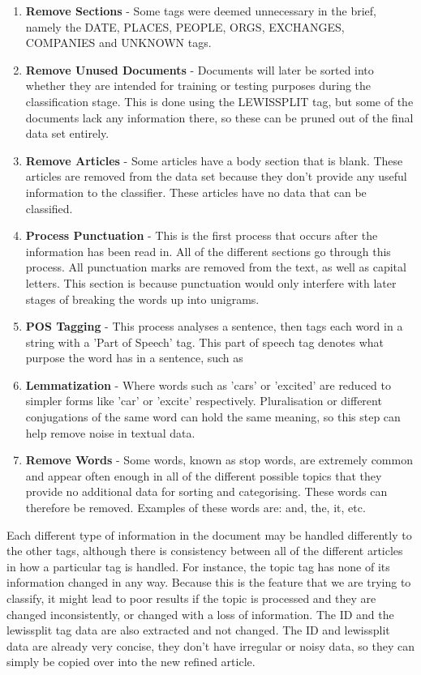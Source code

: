 \documentclass[11pt]{article}
\begin{document}
\begin{enumerate}
\item \textbf{Remove Sections} - Some tags were deemed unnecessary in the brief, namely the DATE, PLACES, PEOPLE, ORGS, EXCHANGES, COMPANIES and UNKNOWN    tags.
\item \textbf{Remove Unused Documents} - Documents will later be sorted into whether they are intended for training or testing purposes during the classification stage. This is done using the LEWISSPLIT tag, but some of the documents lack any information there, so these can be pruned out of the final data set entirely.
\item \textbf{Remove Articles} - Some articles have a body section that is blank. These articles are removed from the data set because they don’t provide any useful information to the classifier. These articles have no data that can be classified.
\item \textbf{Process Punctuation} - This is the first process that occurs after the information has been read in. All of the different sections go through this process. All punctuation marks are removed from the text, as well as capital letters. This section is because punctuation would only interfere with later stages of breaking the words up into unigrams.
\item \textbf{POS Tagging}  - This process analyses a sentence, then tags each word in a string with a 'Part of Speech' tag. This part of speech tag denotes what purpose the word has in a sentence, such as
\item \textbf{Lemmatization} - Where words such as 'cars' or 'excited' are reduced to simpler forms like 'car' or 'excite' respectively. Pluralisation or different conjugations of the same word can hold the same meaning, so this step can help remove noise in textual data.
\item \textbf{Remove Words} - Some words, known as stop words, are extremely common and appear often enough in all of the different possible topics that they provide no additional data for sorting and categorising. These words can therefore be removed. Examples of these words are: and, the, it, etc.
\end{enumerate}

Each different type of information in the document may be handled differently to the other tags, although there is consistency between all of the different articles in how a particular tag is handled. For instance, the topic tag has none of its information changed in any way. Because this is the feature that we are trying to classify, it might lead to poor results if the topic is processed and they are changed inconsistently, or changed with a loss of information. The ID and the lewissplit tag data are also extracted and not changed. The ID and lewissplit data are already very concise, they don't have irregular or noisy data, so they can simply be copied over into the new refined article. \\
\end{document}
